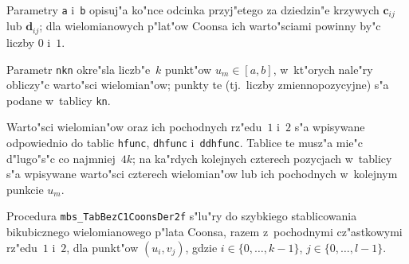 Parametry \texttt{a} i~\texttt{b} opisuj"a ko"nce odcinka przyj"etego
za dziedzin"e krzywych $\bm{c}_{ij}$ lub $\bm{d}_{ij}$; dla wielomianowych
p"lat"ow Coonsa ich warto"sciami powinny by"c liczby $0$ i~$1$.

Parametr \texttt{nkn} okre"sla liczb"e~$k$ punkt"ow $u_m\in[a,b]$, w~kt"orych
nale"ry obliczy"c warto"sci wielomian"ow; punkty te (tj.\ liczby
zmiennopozycyjne) s"a podane w~tablicy \texttt{kn}.

Warto"sci wielomian"ow oraz ich pochodnych rz"edu~$1$ i~$2$ s"a wpisywane
odpowiednio do tablic \texttt{hfunc}, \texttt{dhfunc} i~\texttt{ddhfunc}.
Tablice te musz"a mie"c d"lugo"s"c co najmniej~$4k$; na ka"rdych kolejnych
czterech pozycjach w~tablicy s"a wpisywane warto"sci czterech wielomian"ow
lub ich pochodnych w~kolejnym punkcie $u_m$.

\vspace{\bigskipamount}

\vspace{\bigskipamount}
Procedura \texttt{mbs\_TabBezC1CoonsDer2f} s"lu"ry do szybkiego stablicowania
bikubicznego wielomianowego p"lata Coonsa, razem z~pochodnymi cz"astkowymi
rz"edu~$1$ i~$2$, dla punkt"ow $(u_i,v_j)$, gdzie $i\in\{0,\ldots,k-1\}$,
$j\in\{0,\ldots,l-1\}$.

